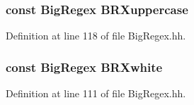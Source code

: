 \subsubsection{\setlength{\rightskip}{0pt plus 5cm}const {\bf Big\-Regex} BRXuppercase}\label{BigRegex_8hh_a8}




Definition at line 118 of file Big\-Regex.hh.
\subsubsection{\setlength{\rightskip}{0pt plus 5cm}const {\bf Big\-Regex} BRXwhite}\label{BigRegex_8hh_a3}




Definition at line 111 of file Big\-Regex.hh.